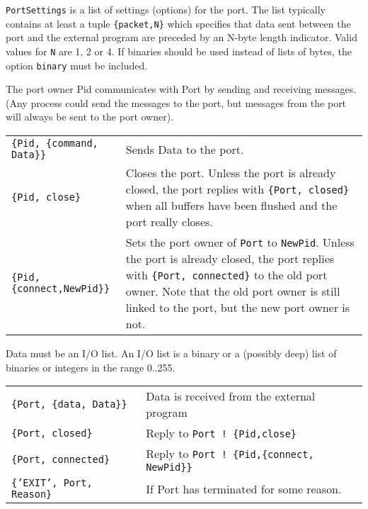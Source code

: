 \texttt{PortSettings} is a list of settings (options) for the
port. The list typically contains at least a tuple
\texttt{\{packet,N\}} which specifies that data sent between the port
and the external program are preceded by an N-byte length
indicator. Valid values for \texttt{N} are 1, 2 or 4. If binaries
should be used instead of lists of bytes, the option \texttt{binary}
must be included.

The port owner Pid communicates with Port by sending and receiving
messages. (Any process could send the messages to the port, but
messages from the port will always be sent to the port owner).

\begin{center}
\begin{tabular}{|>{\raggedright}p{115pt}|>{\raggedright}p{211pt}|}
\hline
\multicolumn{2}{|p{326pt}|}{Messages sent to a port}\tabularnewline
\hline
\texttt{\{Pid, \{command, Data\}\}}  & Sends Data to the port. \tabularnewline
\hline
\texttt{\{Pid, close\}}  & Closes the port. Unless the port is already closed, the port replies
with \texttt{\{Port, closed\}} when all buffers have been flushed and the port really closes.
\tabularnewline
\hline
\texttt{\{Pid,\{connect,NewPid\}\}}  & Sets the port owner of \texttt{Port} to \texttt{NewPid}. Unless the port is already closed, the port replies with \texttt{\{Port, connected\}} to the old port owner. Note that the old port owner is still linked to the port, but the new port
owner is not. \tabularnewline
\hline
\end{tabular}
\end{center}

Data must be an I/O list. An I/O list is a binary or a (possibly deep)
list of binaries or integers in the range 0..255.

\begin{center}
\begin{tabular}{|>{\raggedright}p{121pt}|>{\raggedright}p{204pt}|}
\hline
\multicolumn{2}{|p{326pt}|}{Messages received from a port}\tabularnewline
\hline
\texttt{\{Port, \{data, Data\}\}}  & Data is received from the external program\tabularnewline
\hline
\texttt{\{Port, closed\}}  & Reply to \texttt{Port ! \{Pid,close\}}\tabularnewline
\hline
\texttt{\{Port, connected\}}  & Reply to \texttt{Port ! \{Pid,\{connect, NewPid\}\}} \tabularnewline
\hline
\texttt{\{'EXIT', Port, Reason\}}  & If Port has terminated for some reason. \tabularnewline
\hline
\end{tabular}
\end{center}

